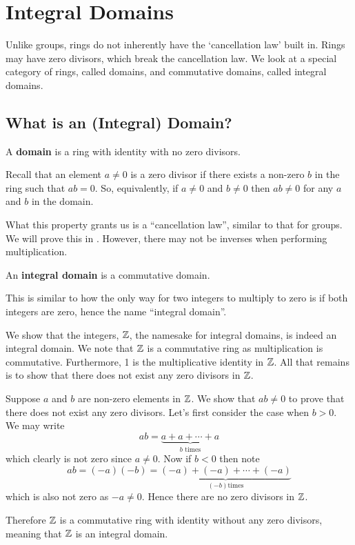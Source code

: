 \chapter{Integral Domains}
Unlike groups, rings do not inherently have the `cancellation law' built in. Rings may have zero divisors, which break the cancellation law. We look at a special category of rings, called domains, and commutative domains, called integral domains.

\section{What is an (Integral) Domain?}
\begin{definition}
    A \textbf{domain} is a ring with identity with no zero divisors.
\end{definition}
\begin{remark}
    Recall that an element $a \neq 0$ is a zero divisor if there exists a non-zero $b$ in the ring such that $ab = 0$. So, equivalently, if $a \neq 0$ and $b \neq 0$ then $ab \neq 0$ for any $a$ and $b$ in the domain.
\end{remark}
\begin{remark}
    What this property grants us is a ``cancellation law'', similar to that for groups. We will prove this in . However, there may not be inverses when performing multiplication.
\end{remark}

\begin{definition}
    An \textbf{integral domain} is a commutative domain.
\end{definition}
\begin{remark}
    This is similar to how the only way for two integers to multiply to zero is if both integers are zero, hence the name ``integral domain''.
\end{remark}

\begin{example}\label{example-integers-is-integral-domain}
    We show that the integers, $\mathbb{Z}$, the namesake for integral domains, is indeed an integral domain. We note that $\mathbb{Z}$ is a commutative ring as multiplication is commutative. Furthermore, 1 is the multiplicative identity in $\mathbb{Z}$. All that remains is to show that there does not exist any zero divisors in $\mathbb{Z}$.

    Suppose $a$ and $b$ are non-zero elements in $\mathbb{Z}$. We show that $ab \neq 0$ to prove that there does not exist any zero divisors. Let's first consider the case when $b > 0$. We may write
    \[
        ab = \underbrace{a + a + \cdots + a}_{b \text{ times}}
    \]
    which clearly is not zero since $a \neq 0$. Now if $b < 0$ then note
    \[
        ab = (-a)(-b) = \underbrace{(-a) + (-a) + \cdots + (-a)}_{(-b) \text{times}}
    \]
    which is also not zero as $-a \neq 0$. Hence there are no zero divisors in $\mathbb{Z}$.

    Therefore $\mathbb{Z}$ is a commutative ring with identity without any zero divisors, meaning that $\mathbb{Z}$ is an integral domain.
\end{example}

